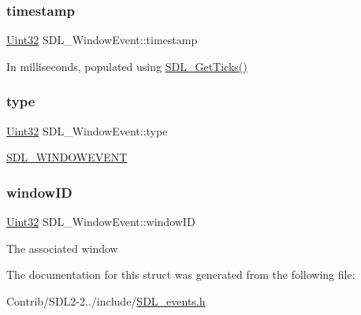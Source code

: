 \subsubsection{\texorpdfstring{timestamp}{timestamp}}
{\footnotesize\ttfamily \mbox{\hyperlink{_s_d_l__stdinc_8h_add440eff171ea5f55cb00c4a9ab8672d}{Uint32}} S\+D\+L\+\_\+\+Window\+Event\+::timestamp}

In milliseconds, populated using \mbox{\hyperlink{_s_d_l__timer_8h_a0b9bc71d6287e0ffafdc3419760fe2b3}{S\+D\+L\+\_\+\+Get\+Ticks()}} \mbox{\label{struct_s_d_l___window_event_a01c8c8fbe8564e690f958d2db560f657}} 
\subsubsection{\texorpdfstring{type}{type}}
{\footnotesize\ttfamily \mbox{\hyperlink{_s_d_l__stdinc_8h_add440eff171ea5f55cb00c4a9ab8672d}{Uint32}} S\+D\+L\+\_\+\+Window\+Event\+::type}

\mbox{\hyperlink{_s_d_l__events_8h_a3b589e89be6b35c02e0dd34a55f3fccaa5ff4e41f0d8b5def11cfe6a69ec0b698}{S\+D\+L\+\_\+\+W\+I\+N\+D\+O\+W\+E\+V\+E\+NT}} \mbox{\label{struct_s_d_l___window_event_a4b31796ffc84fbb7f6e9ba33e127619a}} 
\subsubsection{\texorpdfstring{window\+ID}{windowID}}
{\footnotesize\ttfamily \mbox{\hyperlink{_s_d_l__stdinc_8h_add440eff171ea5f55cb00c4a9ab8672d}{Uint32}} S\+D\+L\+\_\+\+Window\+Event\+::window\+ID}

The associated window 

The documentation for this struct was generated from the following file\+:\begin{DoxyCompactItemize}
\item 
Contrib/\+S\+D\+L2-\/2../include/\mbox{\hyperlink{_s_d_l__events_8h}{S\+D\+L\+\_\+events.\+h}}\end{DoxyCompactItemize}
